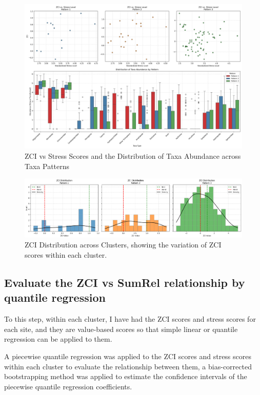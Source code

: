 \begin{figure}[!h]
    \centering
    \includegraphics[width=\textwidth]{../results/preliminary_results/zci_vs_stress_and_taxa_abundance.png}
    \caption{ZCI vs Stress Scores and the Distribution of Taxa Abundance across Taxa Patterns }
    \label{fig:zci_vs_stress_and_taxa_abundance}
\end{figure}

\begin{figure}[!h]
    \centering
    \includegraphics[width=\textwidth]{../results/preliminary_results/ZCI_distribution_across_clusters.png}
    \caption{ZCI Distribution across Clusters, showing the variation of ZCI scores within each cluster.}
    \label{fig:zci_distribution_across_clusters}
\end{figure}

\subsection{Evaluate the ZCI vs  SumRel relationship by quantile regression}

To this step, within each cluster, I have had the ZCI scores and stress scores for each site,
and they are value-based scores so that simple linear or quantile regression can be applied to them.

A piecewise quantile regression was applied to the ZCI scores and stress scores within each cluster 
to evaluate the relationship between them, a bias-corrected bootstrapping method was applied 
to estimate the confidence intervals of the piecewise quantile regression coefficients.

